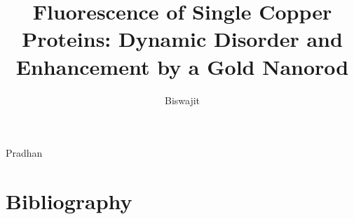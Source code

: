 \documentclass[print]{dissertation}%
\begin{document}
\title[]{Fluorescence of Single Copper Proteins: Dynamic Disorder and Enhancement by a Gold Nanorod}
\author{Biswajit}{Pradhan}

\frontmatter

\tableofcontents
\mainmatter

\thumbtrue





\thumbfalse
\chapter*{Bibliography}






\end{document}
